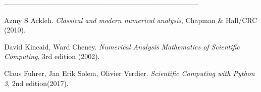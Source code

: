 \documentclass[12pt,a4paper]{article}
\begin{document}
\newpage
\begin{center}
 -----------------------------------------------------------------------------------
\end{center}
\begin{multicols}{2}
\begin{list}{}{\setlength{\topsep}{0mm}\setlength{\itemsep}{0mm}%
\setlength{\parsep}{0mm}\setlength{\leftmargin}{4mm}}
%
\small
\item[1.] Azmy S Ackleh. \textit{Classical and modern numerical analysis}, Chapman \& Hall/CRC (2010).
\item[2.] David Kincaid, Ward Cheney. \textit{Numerical Analysis Mathematics of Scientific Computing}, 3rd edition (2002).
\item[3.] Claus Fuhrer, Jan Erik Solem, Olivier Verdier. \textit{Scientific Computing with Python 3}, 2nd edition(2017).
%
\end{list}
\end{multicols}
\end{document}
